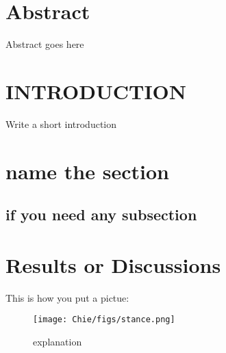 
\section*{Abstract}

Abstract goes here


\section{INTRODUCTION}

Write a short introduction


\section{name the section}

\subsection{if you need any subsection}


\section{Results or Discussions}

This is how you put a pictue:
\begin{figure}
  \centering
  \caption{explanation}
  \texttt{[image: Chie/figs/stance.png]}
  \label{label for referencing}
\end{figure}


